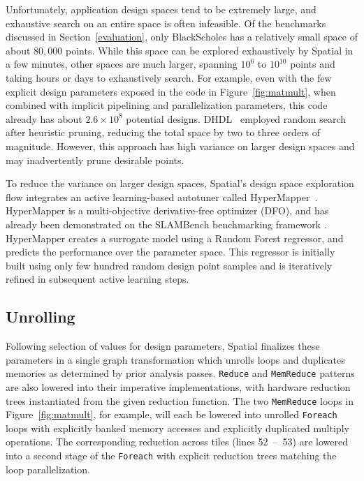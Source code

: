 {%
Unfortunately, application design spaces tend to be extremely large, and exhaustive search on an entire space is often infeasible. Of the benchmarks discussed in Section~\ref{evaluation}, 
only BlackScholes has a relatively small space of about $80,000$ points. While this space can be explored exhaustively by Spatial in a few minutes, other spaces are much larger, spanning $10^6$ to $10^{10}$ points and
taking hours or days to exhaustively search. For example, even with the few explicit design parameters exposed in the code in Figure~\ref{fig:matmult}, when combined with implicit pipelining and parallelization parameters, this code already has about $2.6\times10^8$ potential designs.
DHDL~\cite{dhdl} employed random search after heuristic pruning, reducing the total space by two to three orders of magnitude. However, this approach has high variance on larger design spaces and may inadvertently prune desirable points.

To reduce the variance on larger design spaces, Spatial's design space exploration flow integrates an active learning-based autotuner called HyperMapper~\cite{Bodin2016:PACT16,NardiBSVDK17,Saeedi_ICRA_2017}.
HyperMapper is a multi-objective derivative-free optimizer (DFO), and has already been demonstrated on the SLAMBench benchmarking framework \cite{nardi2015introducing}. 
HyperMapper creates a surrogate model using a Random Forest regressor, and predicts the performance over the parameter space. This regressor is initially built using only few hundred random design point samples and is iteratively refined in subsequent active learning steps.


\subsection{Unrolling}
Following selection of values for design parameters, Spatial finalizes these parameters in a single graph transformation which unrolls loops and duplicates memories as determined by prior analysis passes. 
\texttt{Reduce} and \texttt{MemReduce} patterns are also lowered into their imperative implementations, with hardware reduction trees instantiated from the given reduction function. 
The two \texttt{MemReduce} loops in Figure~\ref{fig:matmult}, for example, will each be lowered into unrolled \texttt{Foreach} loops with explicitly banked memory accesses and explicitly duplicated multiply operations. The corresponding reduction across tiles (lines 52~--~53) are lowered into a second stage of the \texttt{Foreach} with explicit reduction trees matching the loop parallelization. 

}
